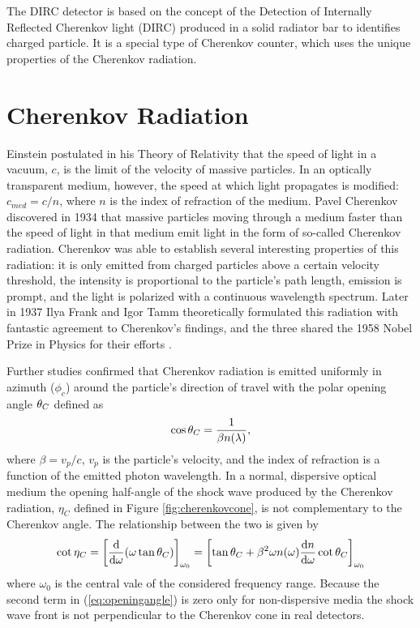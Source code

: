 The DIRC detector is based on the concept of the Detection of Internally Reflected Cherenkov light (DIRC) produced in a solid radiator bar to identifies charged particle. It is a special type of Cherenkov counter, which uses the unique properties of the Cherenkov radiation.

\section{Cherenkov Radiation}
Einstein postulated in his Theory of Relativity that the speed of light in a vacuum, $c$, is the limit of the velocity of massive particles. In an optically transparent medium, however, the speed at which light propagates is modified: $c_{med} = c/n$, where $n$ is the index of refraction of the medium. Pavel Cherenkov discovered in 1934 that massive particles moving through a medium faster than the speed of light in that medium emit light in the form of so-called Cherenkov radiation. Cherenkov was able to establish several interesting properties of this radiation: it is only emitted from charged particles above a certain velocity threshold, the intensity is proportional to the particle's path length, emission is prompt, and the light is polarized with a continuous wavelength spectrum. Later in 1937 Ilya Frank and Igor Tamm theoretically formulated this radiation with fantastic agreement to Cherenkov's findings, and the three shared the 1958 Nobel Prize in Physics for their efforts \cite{CherenkovHistory}.

Further studies confirmed that Cherenkov radiation is emitted uniformly in azimuth ($\phi_c$) around the particle's direction of travel with the polar opening angle $\theta_{C}$ defined as
\begin{equation}
	\cos\theta_{C} = \frac{1}{\beta n(\lambda)},
	\label{eq:cherenkovformula}
\end{equation}
where $\beta = v_p/c$, $v_p$ is the particle's velocity, and the index of refraction is a function of the emitted photon wavelength. In a normal, dispersive optical medium the opening half-angle of the shock wave produced by the Cherenkov radiation, $\eta_C$ defined in Figure \ref{fig:cherenkovcone}, is not complementary to the Cherenkov angle. The relationship between the two is given by
\begin{equation}
	\cot\eta_C = \left[\frac{\mathrm{d}}{\mathrm{d}\omega}(\omega \tan\theta_{C}) \right]_{\omega_0} = \left[\tan\theta_{C} + \beta^2\omega n(\omega) \frac{\mathrm{d} n}{\mathrm{d}\omega}\cot\theta_{C} \right]_{\omega_0}
	\label{eq:openingangle}
\end{equation}
where $\omega_0$ is the central vale of the considered frequency range. Because the second term in (\ref{eq:openingangle}) is zero only for non-dispersive media the shock wave front is not perpendicular to the Cherenkov cone in real detectors.


